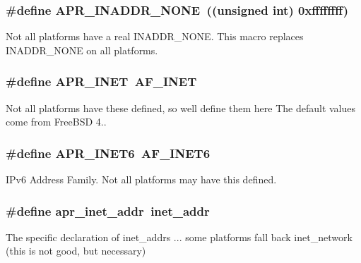 \subsubsection[{\texorpdfstring{A\+P\+R\+\_\+\+I\+N\+A\+D\+D\+R\+\_\+\+N\+O\+NE}{APR_INADDR_NONE}}]{\setlength{\rightskip}{0pt plus 5cm}\#define A\+P\+R\+\_\+\+I\+N\+A\+D\+D\+R\+\_\+\+N\+O\+NE~((unsigned {\bf int}) 0xffffffff)}\hypertarget{group__apr__network__io_ga16eb7ee55ff87a5093f2114ea5351217}{}\label{group__apr__network__io_ga16eb7ee55ff87a5093f2114ea5351217}
Not all platforms have a real I\+N\+A\+D\+D\+R\+\_\+\+N\+O\+NE. This macro replaces I\+N\+A\+D\+D\+R\+\_\+\+N\+O\+NE on all platforms. 
\subsubsection[{\texorpdfstring{A\+P\+R\+\_\+\+I\+N\+ET}{APR_INET}}]{\setlength{\rightskip}{0pt plus 5cm}\#define A\+P\+R\+\_\+\+I\+N\+ET~A\+F\+\_\+\+I\+N\+ET}\hypertarget{group__apr__network__io_gaa96e8e8dbf92bc77643a4032017b3d67}{}\label{group__apr__network__io_gaa96e8e8dbf92bc77643a4032017b3d67}
Not all platforms have these defined, so we\textquotesingle{}ll define them here The default values come from Free\+B\+SD 4.. 
\subsubsection[{\texorpdfstring{A\+P\+R\+\_\+\+I\+N\+E\+T6}{APR_INET6}}]{\setlength{\rightskip}{0pt plus 5cm}\#define A\+P\+R\+\_\+\+I\+N\+E\+T6~A\+F\+\_\+\+I\+N\+E\+T6}\hypertarget{group__apr__network__io_gad09d9ea8995f50f35073ae0c77efb44f}{}\label{group__apr__network__io_gad09d9ea8995f50f35073ae0c77efb44f}
I\+Pv6 Address Family. Not all platforms may have this defined. 
\subsubsection[{\texorpdfstring{apr\+\_\+inet\+\_\+addr}{apr_inet_addr}}]{\setlength{\rightskip}{0pt plus 5cm}\#define apr\+\_\+inet\+\_\+addr~inet\+\_\+addr}\hypertarget{group__apr__network__io_ga46a8b06887871cfd60a3e37385775e22}{}\label{group__apr__network__io_ga46a8b06887871cfd60a3e37385775e22}
The specific declaration of inet\+\_\+addr\textquotesingle{}s ... some platforms fall back inet\+\_\+network (this is not good, but necessary) 

